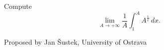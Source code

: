 Compute
\[ \lim_{A\to+\infty}\frac1A\int_1^A
A^{\frac1x}\, dx . \]

Proposed by Jan Šustek, University of Ostrava